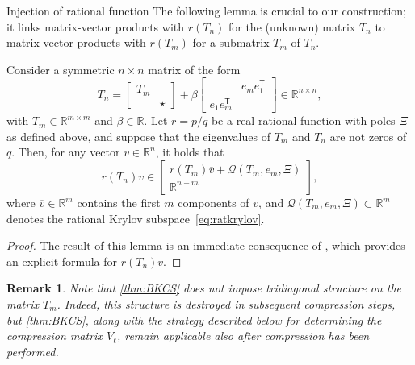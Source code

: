 \documentclass{siamart190516}
\newcommand{\T}{\mathsf{T}}
\newcommand{\R}{\mathbb{R}}
\newtheorem{remark}[theorem]{Remark}
\begin{document}
\begin{paragraph}{Injection of rational function}
The following lemma is crucial to our construction; it links matrix-vector products with $r(T_{n})$ for the (unknown) matrix $T_n$ to 
matrix-vector products with $r(T_{m})$ for a submatrix $T_m$ of $T_n$.
\begin{lemma}\label{thm:BKCS}
   Consider a symmetric $n\times n$
   matrix of the form
      \begin{equation*}
         T_{n}=\begin{bmatrix}
             T_{m}&\\& \star
         \end{bmatrix} + \beta \begin{bmatrix}
             &e_me_1^{\T}\\e_1e_m^{\T} &
         \end{bmatrix}\in \R^{n\times n},
     \end{equation*}
     with $T_{m} \in \R^{m \times m}$ and $\beta \in \R$.
     Let $r = p/q$ be a real rational function with poles $\Xi$ as defined above, and suppose that the eigenvalues
     of $T_m$ and $T_n$ are not zeros of $q$. Then, for any vector $v\in \R^{n}$, it holds that
     \begin{equation*}
         r(T_{n})  v \in
         \begin{bmatrix}
            r(T_{m})  \overline{v} + \mathcal{Q}(T_{m},e_m,\Xi) \\
              \R^{n-m}
         \end{bmatrix},
     \end{equation*}
     where $\overline{v}\in \R^m$ contains the first $m$ components of $v$, and $\mathcal{Q}(T_{m},e_m,\Xi)\subset \R^{m}$ denotes the rational Krylov subspace~\eqref{eq:ratkrylov}. 
\end{lemma}   
\begin{proof}
    The result of this lemma is an immediate consequence of \cite[Cor.~2.6]{casulli2024low}, which provides an explicit formula for $r(T_{n})v$.
\end{proof}
\begin{remark}
    Note that \cref{thm:BKCS} does not impose tridiagonal structure on the matrix $T_{m}$. Indeed, this structure is destroyed in subsequent compression steps, but \cref{thm:BKCS}, along with the strategy described below for determining the compression matrix $V_\ell$, remain applicable also after compression has been performed. 
\end{remark}


\end{paragraph}
\end{document}
